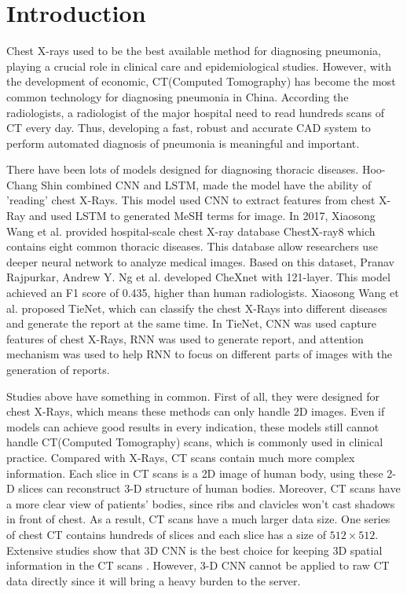 \documentclass[runningheads]{llncs}
\begin{document}
\section{Introduction}
Chest X-rays used to be the best available method for diagnosing pneumonia, playing a crucial role in clinical care\cite{Franquet2001Imaging} and epidemiological studies\cite{Thomas2005Standardized}. However, with the development of economic, CT(Computed Tomography) has become the most common technology for diagnosing pneumonia in China. According the radiologists, a radiologist of the major hospital need to read hundreds scans of CT every day. Thus, developing a fast, robust and accurate CAD system to perform automated diagnosis of pneumonia is meaningful and important. 

There have been lots of models designed for diagnosing thoracic diseases.
Hoo-Chang Shin \cite{Shin2016Learning} combined CNN and LSTM,  made the model have the ability of 'reading' chest X-Rays. This model used CNN to extract features from chest X-Ray and used LSTM to generated MeSH\cite{timmurphy.org} terms for image. In 2017, Xiaosong Wang et al.\cite{Wang2017ChestX} provided hospital-scale chest X-ray database ChestX-ray8 which contains eight common thoracic diseases. This database allow researchers use deeper neural network to analyze medical images. Based on this dataset, Pranav Rajpurkar, Andrew Y. Ng et al. \cite{Rajpurkar2017CheXNet} developed CheXnet with 121-layer. This model achieved an F1 score of 0.435, higher than human radiologists. Xiaosong Wang et al.\cite{Wang2018TieNet} proposed TieNet, which can classify the chest X-Rays into different diseases and generate the report at the same time. In TieNet, CNN was used capture features of chest X-Rays, RNN was used to generate report, and attention mechanism was used to help RNN to focus on different parts of images with the generation of reports. 

Studies above have something in common. First of all, they were designed for chest X-Rays, which means these methods can only handle 2D images. Even if models can achieve good results in every indication, these models still cannot handle CT(Computed Tomography) scans, which is commonly used in clinical practice. Compared with  X-Rays, CT scans contain much more complex information.  Each slice in CT scans is a 2D image of human body, using these 2-D slices can reconstruct 3-D structure of human bodies. Moreover, CT scans  have a more clear view of patients' bodies, since ribs and clavicles won't cast shadows in front of chest. As a result, CT scans have a much larger data size. One series of chest CT contains hundreds of slices and each slice has a size of $512 \times 512$.  Extensive studies show that 3D CNN is  the best choice for keeping 3D spatial information in the CT scans \cite{Yorozu1987Electron}. However, 3-D CNN cannot be applied to raw CT data directly since it will bring a heavy burden to the server. 
\end{document}
